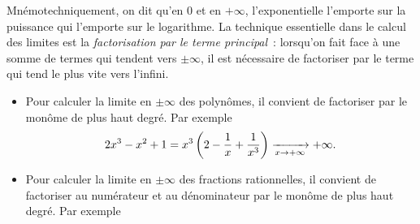 \documentclass{magnolia}
\begin{document}
\begin{remarques}
\remarque Mnémotechniquement, on dit qu'en 0 et en $+\infty$, l'exponentielle
  l'emporte sur la puissance qui l'emporte sur le logarithme.
\remarque La technique essentielle dans le calcul des limites est la
  \emph{factorisation par le terme principal}~: lorsqu'on fait face à une somme de termes
  qui tendent vers $\pm\infty$, il est nécessaire de factoriser par le terme qui tend
  \og le plus vite vers l'infini\fg. 
\begin{itemize}
\item Pour calculer la limite en $\pm\infty$ des polynômes, il convient de
  factoriser par le monôme de plus haut degré. Par exemple
  $$2x^3-x^2+1=x^3\left(2-\frac{1}{x}+\frac{1}{x^3}\right)\xrightarrow[x\rightarrow +\infty]{}+\infty.$$
\item Pour calculer la limite en $\pm\infty$ des fractions rationnelles, il
  convient de factoriser au numérateur et au dénominateur par le monôme de
  plus haut degré. Par exemple
  

\end{itemize}
\end{remarques}
\end{document}
